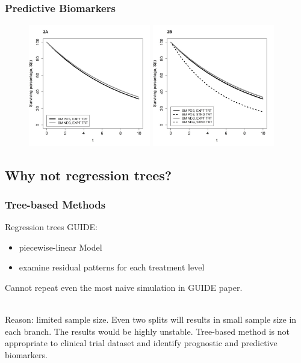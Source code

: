 \documentclass{beamer}
\begin{document}
    
    \begin{frame}
    \frametitle{Predictive Biomarkers}
    
    \begin{figure}
        \includegraphics[width=0.475\textwidth]{predictive3.jpg}
        \hfill
        \includegraphics[width=0.475\textwidth]{predictive4.jpg}
     \end{figure}
    
    \end{frame}
    
    
    
    
    \subsection{Why not regression trees?}
    
    \begin{frame}
    \frametitle{Tree-based Methods}
    
    Regression trees GUIDE\cite{loh}:
    
    \begin{itemize}
        \item piecewise-linear Model
        \item examine residual patterns for each treatment level
    \end{itemize}
    
    Cannot repeat even the most naive simulation in GUIDE paper.\\~
    
    Reason: limited sample size. Even two splits will results in small sample size in each branch. The results would be highly unstable. Tree-based method is not appropriate
    to clinical trial dataset and identify prognostic and predictive biomarkers.
    
    \end{frame}
    
\end{document}
